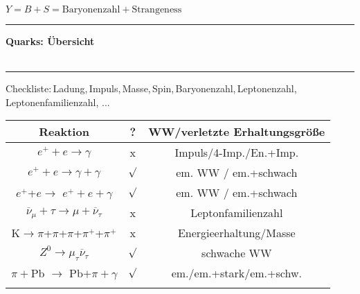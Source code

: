 \documentclass[10pt,twoside,a4paper]{article}
\begin{document}
\begin{multicols*}{3}
$Y = B+S = \text{Baryonenzahl} + \text{Strangeness}$
\\ \rule[0ex]{\columnwidth}{0.5pt}
\textbf{Quarks: Übersicht}\\
%
%
%
\\ \rule[0ex]{\columnwidth}{0.5pt}
Checkliste:\,Ladung,\,Impuls,\,Masse,\,Spin,\,Baryonenzahl,\,Leptonenzahl, Leptonenfamilienzahl, ...
\ \\{\tiny
\begin{tabular}{|c|c|c|}
\hline
 \textbf{Reaktion} & \textbf{?} & \textbf{WW/verletzte Erhaltungsgröße} \\
\hline
$e^+ + e \rightarrow \gamma$ & x & \tiny Impuls/4-Imp./En.+Imp.  \\
\hline 
\tiny $e^+ + e \rightarrow \gamma+\gamma$ & $\surd$ & em. WW / em.+schwach \\
\hline
$e^+$+$e\rightarrow$ $e^++e+\gamma$ & $\surd$ & em. WW / em.+schwach\\
\hline
$\overline{\nu}_\mu+\tau\rightarrow\mu+\overline{\nu}_\tau$ & x & Leptonfamilienzahl\\
\hline
K$\rightarrow$$\pi$+$\pi$+$\pi$+$\pi^+$+$\pi^+$ & x & Energieerhaltung/Masse\\
\hline
$Z^0\rightarrow\mu_\tau\overline{\nu}_\tau$ & $\surd$ & schwache WW \\
\hline
$\pi+$Pb $\rightarrow$ Pb$+\pi+\gamma$ & $\surd$ & em./em.+stark/em.+schw.\\
\hline
$$
\end{tabular}}
\end{multicols*}
\end{document}
